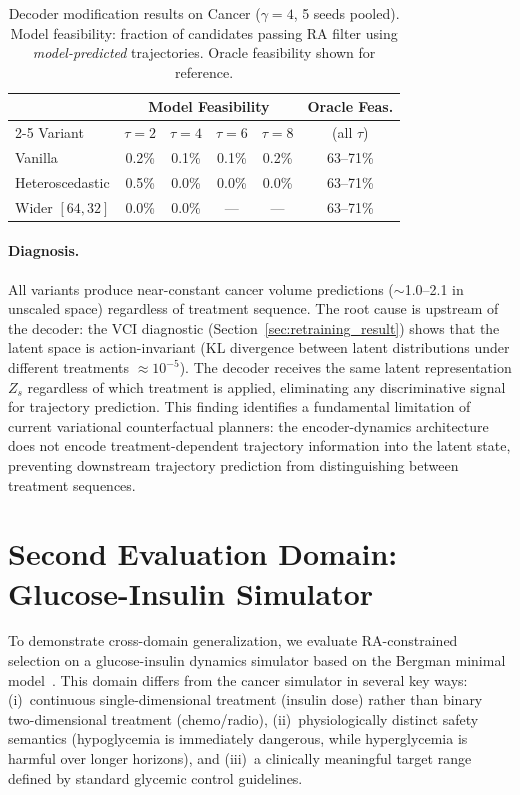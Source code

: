 \documentclass{article}
\begin{document}
\begin{table}[h]
\centering
\caption{Decoder modification results on Cancer ($\gamma = 4$, 5 seeds pooled). Model feasibility: fraction of candidates passing RA filter using \emph{model-predicted} trajectories. Oracle feasibility shown for reference.}
\label{tab:decoder_mods}
\small
\begin{tabular}{l cccc c}
\toprule
& \multicolumn{4}{c}{Model Feasibility} & Oracle Feas. \\
\cmidrule(lr){2-5}
Variant & $\tau{=}2$ & $\tau{=}4$ & $\tau{=}6$ & $\tau{=}8$ & (all $\tau$) \\
\midrule
Vanilla        & 0.2\% & 0.1\% & 0.1\% & 0.2\% & 63--71\% \\
Heteroscedastic & 0.5\% & 0.0\% & 0.0\% & 0.0\% & 63--71\% \\
Wider $[64,32]$ & 0.0\% & 0.0\% & ---   & ---   & 63--71\% \\
\bottomrule
\end{tabular}
\end{table}

\paragraph{Diagnosis.} All variants produce near-constant cancer volume predictions ($\sim$1.0--2.1 in unscaled space) regardless of treatment sequence. The root cause is upstream of the decoder: the VCI diagnostic (Section~\ref{sec:retraining_result}) shows that the latent space is action-invariant (KL divergence between latent distributions under different treatments $\approx 10^{-5}$). The decoder receives the same latent representation $Z_s$ regardless of which treatment is applied, eliminating any discriminative signal for trajectory prediction. This finding identifies a fundamental limitation of current variational counterfactual planners: the encoder-dynamics architecture does not encode treatment-dependent trajectory information into the latent state, preventing downstream trajectory prediction from distinguishing between treatment sequences.

\section{Second Evaluation Domain: Glucose-Insulin Simulator}
\label{app:glucose}

To demonstrate cross-domain generalization, we evaluate RA-constrained selection on a glucose-insulin dynamics simulator based on the Bergman minimal model~\citep{bergman1979quantitative}. This domain differs from the cancer simulator in several key ways: (i)~continuous single-dimensional treatment (insulin dose) rather than binary two-dimensional treatment (chemo/radio), (ii)~physiologically distinct safety semantics (hypoglycemia is immediately dangerous, while hyperglycemia is harmful over longer horizons), and (iii)~a clinically meaningful target range defined by standard glycemic control guidelines.
\end{document}

